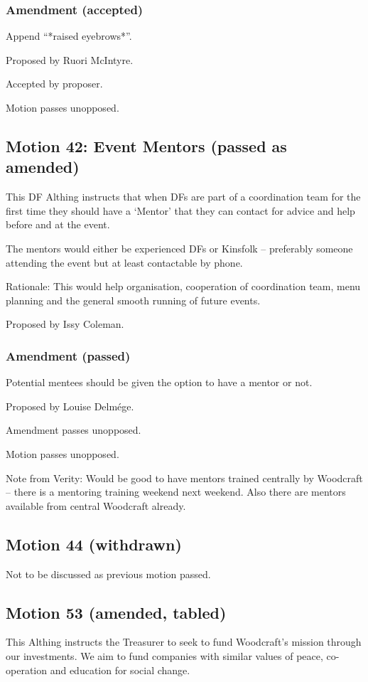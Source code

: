 \documentclass[a4paper, 12pt]{article}
\begin{document}
\subsubsection{Amendment (accepted)}
Append ``*raised eyebrows*''.

Proposed by Ruori McIntyre.

Accepted by proposer.

Motion passes unopposed.

\subsection{Motion 42: Event Mentors (passed as amended)}
This DF Althing instructs that when DFs are part of a coordination team for the first time they should have a `Mentor' that they can contact for advice and help before and at the event.

The mentors would either be experienced DFs or Kinsfolk -- preferably someone attending the event but at least contactable by phone.

Rationale: This would help organisation, cooperation of coordination team, menu planning and the general smooth running of future events.

Proposed by Issy Coleman.

\subsubsection{Amendment (passed)}
Potential mentees should be given the option to have a mentor or not.

Proposed by Louise Delmége.

Amendment passes unopposed.

Motion passes unopposed.

Note from Verity: Would be good to have mentors trained centrally by Woodcraft -- there is a mentoring training weekend next weekend. Also there are mentors available from central Woodcraft already.

\subsection{Motion 44 (withdrawn)}
Not to be discussed as previous motion passed.

\subsection{Motion 53 (amended, tabled)}
This Althing instructs the Treasurer to seek to fund Woodcraft's mission through our investments. We aim to fund companies with similar values of peace, co-operation and education for social change.
\end{document}
